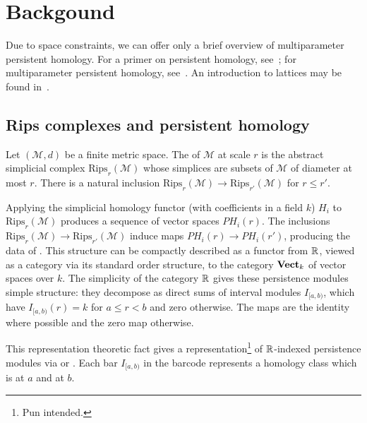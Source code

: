 \documentclass{article}
\begin{document}
\section{Backgound}
Due to space constraints, we can offer only a brief overview of multiparameter
persistent homology. For a primer on persistent homology,
see~\cite{ghrist_barcodes:_2008,carlsson_topology_2009}; for multiparameter
persistent homology, see~\cite{}. An introduction to lattices may be found in~\cite{}. 

\subsection{Rips complexes and persistent homology}
Let $(\mathcal M,d)$ be a finite metric space. The  of $\mathcal M$ at scale $r$ is the abstract simplicial complex
$\text{Rips}_r(\mathcal M)$ whose simplices are subsets of $\mathcal M$ of
diameter at most $r$. There is a natural inclusion $\text{Rips}_r(\mathcal M)
\to \text{Rips}_{r'}(\mathcal M)$ for $r \leq r'$.

Applying the simplicial homology functor (with coefficients in a field $k$)
$H_i$ to $\text{Rips}_r(\mathcal M)$ produces a sequence of vector spaces
$PH_i(r)$. The inclusions $\text{Rips}_r(\mathcal M) \to
\text{Rips}_{r'}(\mathcal M)$ induce maps $PH_i(r) \to PH_i(r')$, producing the
data of . This structure can be compactly
described as a functor from $\mathbb{R}$, viewed as a category via its standard order
structure, to the category $\operatorname{\mathbf{Vect}}_k$ of vector spaces over $k$. The simplicity
of the category $\mathbb{R}$ gives these persistence modules simple structure: they
decompose as direct sums of interval modules $I_{[a,b)}$, which have
$I_{[a,b)}(r) = k$ for $a \leq r < b$ and zero otherwise. The maps are
the identity where possible and the zero map otherwise.

This representation theoretic fact gives a representation\footnote{Pun intended.} of
$\mathbb{R}$-indexed persistence modules via  or
. Each bar $I_{[a,b)}$ in the barcode represents
a homology class which is  at $a$ and  at $b$.
\end{document}

